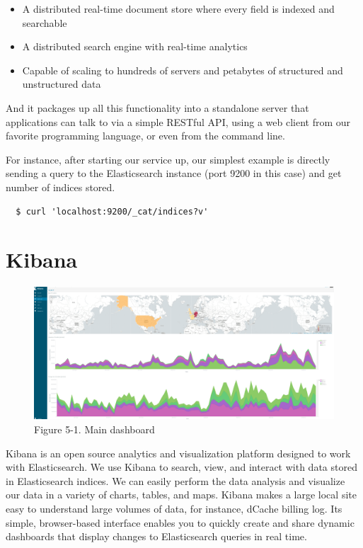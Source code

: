 \documentclass[]{article}
\begin{document}
\begin{itemize}
\itemsep1pt\parskip0pt
\item
  A distributed real-time document store where every field is indexed
  and searchable
\item
  A distributed search engine with real-time analytics
\item
  Capable of scaling to hundreds of servers and petabytes of structured
  and unstructured data
\end{itemize}

And it packages up all this functionality into a standalone server that
applications can talk to via a simple RESTful API, using a web client
from our favorite programming language, or even from the command line.

For instance, after starting our service up, our simplest example is
directly sending a query to the Elasticsearch instance (port 9200 in
this case) and get number of indices stored.

\begin{verbatim}
  $ curl 'localhost:9200/_cat/indices?v'
\end{verbatim}

\section{Kibana}\label{kibana}

\begin{figure}[htbp]
\centering
\includegraphics{images/kibana.png}
\caption{Figure 5-1. Main dashboard}
\end{figure}

Kibana is an open source analytics and visualization platform designed
to work with Elasticsearch. We use Kibana to search, view, and interact
with data stored in Elasticsearch indices. We can easily perform the
data analysis and visualize our data in a variety of charts, tables, and
maps. Kibana makes a large local site easy to understand large volumes
of data, for instance, dCache billing log. Its simple, browser-based
interface enables you to quickly create and share dynamic dashboards
that display changes to Elasticsearch queries in real time.
\end{document}
